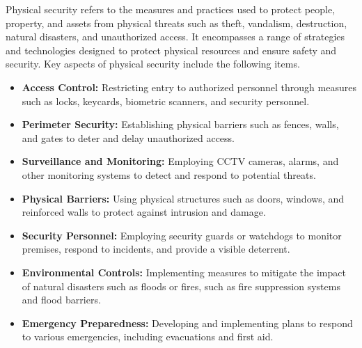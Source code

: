  Physical security refers to the measures and practices used to protect people, property, and assets from physical threats such as theft, vandalism, destruction, natural disasters, and unauthorized access. It encompasses a range of strategies and technologies designed to protect physical resources and ensure safety and security. Key aspects of physical security include the following items.
\begin{itemize}
    \item \textbf{Access Control:} Restricting entry to authorized personnel through measures such as locks, keycards, biometric scanners, and security personnel.
    \item \textbf{Perimeter Security:} Establishing physical barriers such as fences, walls, and gates to deter and delay unauthorized access.
    \item \textbf{Surveillance and Monitoring:} Employing CCTV cameras, alarms, and other monitoring systems to detect and respond to potential threats.
    \item \textbf{Physical Barriers:} Using physical structures such as doors, windows, and reinforced walls to protect against intrusion and damage.
    \item \textbf{Security Personnel:} Employing security guards or watchdogs to monitor premises, respond to incidents, and provide a visible deterrent.
    \item \textbf{Environmental Controls:} Implementing measures to mitigate the impact of natural disasters such as floods or fires, such as fire suppression systems and flood barriers.
    \item \textbf{Emergency Preparedness:} Developing and implementing plans to respond to various emergencies, including evacuations and first aid.
\end{itemize}

